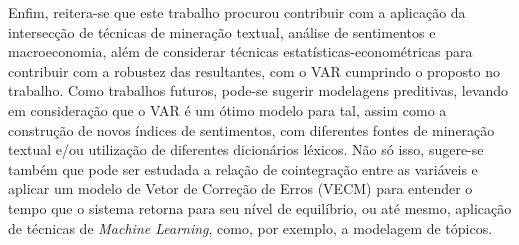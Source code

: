 Enfim, reitera-se que este trabalho procurou contribuir com a aplicação da intersecção de técnicas de mineração textual, análise de sentimentos e macroeconomia, além de considerar técnicas estatísticas-econométricas para contribuir com a robustez das resultantes, com o VAR cumprindo o proposto no trabalho. Como trabalhos futuros, pode-se sugerir modelagens preditivas, levando em consideração que o VAR é um ótimo modelo para tal, assim como a construção de novos índices de sentimentos, com diferentes fontes de mineração textual e/ou utilização de diferentes dicionários léxicos. Não só isso, sugere-se também que pode ser estudada a relação de cointegração entre as variáveis e aplicar um modelo de Vetor de Correção de Erros (VECM) para entender o tempo que o sistema retorna para seu nível de equilíbrio, ou até mesmo, aplicação de técnicas de \textit{Machine Learning}, como, por exemplo, a modelagem de tópicos.